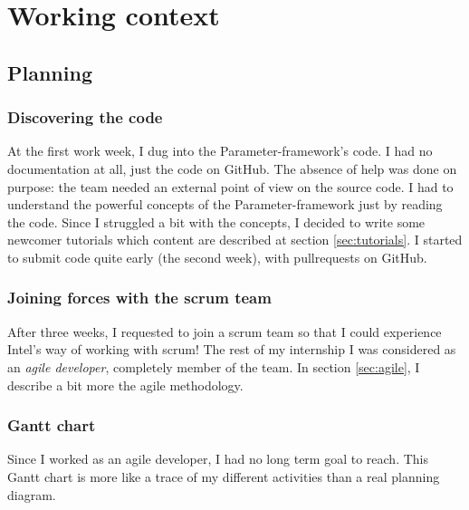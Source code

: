 \chapter{Working context}\label{chap:organisation}

\section{Planning}
\subsection{Discovering the code}
At the first work week, I dug into the Parameter-framework's code. I had no
documentation at all, just the code on \gls{GitHub}. The absence of help was done on
purpose: the team needed an external point of view on the source code. I had
to understand the powerful concepts of the Parameter-framework just by reading
the code. Since I struggled a bit with the concepts, I decided to write some
newcomer tutorials which content are described at section \ref{sec:tutorials}.
I started to submit code quite early (the second week), with \gls{pullrequests} on \gls{GitHub}.

\subsection{Joining forces with the scrum team}
After three weeks, I requested to join a \gls{scrum} team so that I could experience
Intel's way of working with \gls{scrum}!
The rest of my internship I was considered as an \emph{agile developer}, completely member of the team.
In section \ref{sec:agile}, I describe a bit more the agile methodology.

\subsection{Gantt chart}
Since I worked as an agile developer, I had no long term goal to reach. This
Gantt chart is more like a trace of my different activities than a real planning
diagram.




